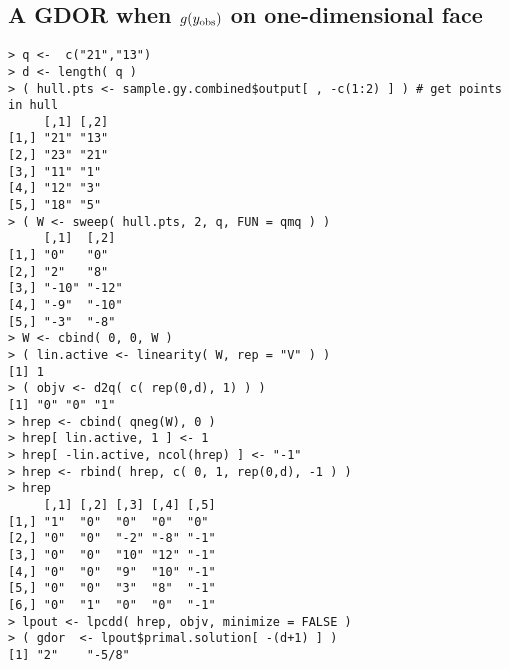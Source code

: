 \subsection{A GDOR when $g(y_{\text{obs}})$ on one-dimensional face}
\begin{verbatim}
> q <-  c("21","13")
> d <- length( q )
> ( hull.pts <- sample.gy.combined$output[ , -c(1:2) ] ) # get points in hull
     [,1] [,2]
[1,] "21" "13"
[2,] "23" "21"
[3,] "11" "1" 
[4,] "12" "3" 
[5,] "18" "5" 
> ( W <- sweep( hull.pts, 2, q, FUN = qmq ) )
     [,1]  [,2] 
[1,] "0"   "0"  
[2,] "2"   "8"  
[3,] "-10" "-12"
[4,] "-9"  "-10"
[5,] "-3"  "-8" 
> W <- cbind( 0, 0, W )
> ( lin.active <- linearity( W, rep = "V" ) )
[1] 1
> ( objv <- d2q( c( rep(0,d), 1) ) )
[1] "0" "0" "1"
> hrep <- cbind( qneg(W), 0 ) 
> hrep[ lin.active, 1 ] <- 1
> hrep[ -lin.active, ncol(hrep) ] <- "-1"
> hrep <- rbind( hrep, c( 0, 1, rep(0,d), -1 ) )
> hrep
     [,1] [,2] [,3] [,4] [,5]
[1,] "1"  "0"  "0"  "0"  "0" 
[2,] "0"  "0"  "-2" "-8" "-1"
[3,] "0"  "0"  "10" "12" "-1"
[4,] "0"  "0"  "9"  "10" "-1"
[5,] "0"  "0"  "3"  "8"  "-1"
[6,] "0"  "1"  "0"  "0"  "-1"
> lpout <- lpcdd( hrep, objv, minimize = FALSE )
> ( gdor  <- lpout$primal.solution[ -(d+1) ] )
[1] "2"    "-5/8"
\end{verbatim}


